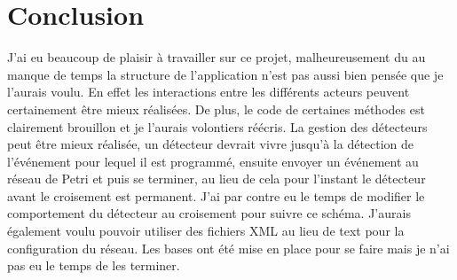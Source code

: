 \documentclass[11pt,a4paper, openany]{memoir}
\begin{document}
\chapter{Conclusion}

J'ai eu beaucoup de plaisir à travailler sur ce projet, malheureusement du au manque de temps la structure de l'application n'est pas aussi bien pensée que je l'aurais voulu. En effet les interactions entre les différents acteurs peuvent certainement être mieux réalisées. De plus, le code de certaines méthodes est clairement brouillon et je l'aurais volontiers réécris. La gestion des détecteurs peut être mieux réalisée, un détecteur devrait vivre jusqu'à la détection de l'événement pour lequel il est programmé, ensuite envoyer un événement au réseau de Petri et puis se terminer, au lieu de cela pour l'instant le détecteur avant le croisement est permanent. J'ai par contre eu le temps de modifier le comportement du détecteur au croisement pour suivre ce schéma. J'aurais également voulu pouvoir utiliser des fichiers XML au lieu de text pour la configuration du réseau. Les bases ont été mise en place pour se faire mais je n'ai pas eu le temps de les terminer.




%
\end{document}
